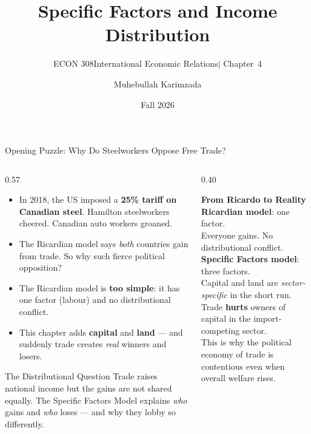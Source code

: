 \documentclass[aspectratio=169]{beamer}
\title{\textbf{Specific Factors and Income Distribution}}
\subtitle{{\large ECON 308\enspace International Economic
  Relations\enspace\textcolor{UNBCGold}{$|$}\enspace
  Chapter~4}}
\author{Muhebullah Karimzada}
\institute{School of Economics\\
           University of Northern British Columbia}
\date{Fall 2026}
\begin{document}

\begin{frame}[plain]
\titlepage
\end{frame}

\begin{frame}[shrink=8]{Opening Puzzle: Why Do Steelworkers Oppose Free Trade?}
\begin{columns}[T]
\begin{column}{0.57\textwidth}
\begin{itemize}
  \item In 2018, the US imposed a \textbf{25\% tariff on
        Canadian steel}.  Hamilton steelworkers cheered.
        Canadian auto workers groaned.
  \item The Ricardian model says \emph{both} countries gain
        from trade.  So why such fierce political opposition?
  \item The Ricardian model is \textbf{too simple}: it has
        one factor (labour) and no distributional conflict.
  \item This chapter adds \textbf{capital} and \textbf{land}
        --- and suddenly trade creates \emph{real} winners
        and losers.
\end{itemize}
\vspace{0.3em}
\begin{insight}{The Distributional Question}
\small Trade raises national income but the gains are not
shared equally.  The Specific Factors Model explains
\emph{who} gains and \emph{who} loses --- and why they
lobby so differently.
\end{insight}
\end{column}
\begin{column}{0.40\textwidth}
\begin{varbox}
\small\textbf{From Ricardo to Reality}\\[0.3em]
\textbf{Ricardian model}: one factor.\\
Everyone gains.  No distributional conflict.\\[0.3em]
\textbf{Specific Factors model}: three factors.\\
Capital and land are \emph{sector-specific} in the
short run.  Trade \textbf{hurts} owners of capital
in the import-competing sector.\\[0.3em]
This is why the political economy of trade is
contentious even when overall welfare rises.
\end{varbox}
\end{column}
\end{columns}
\end{frame}
\end{document}
